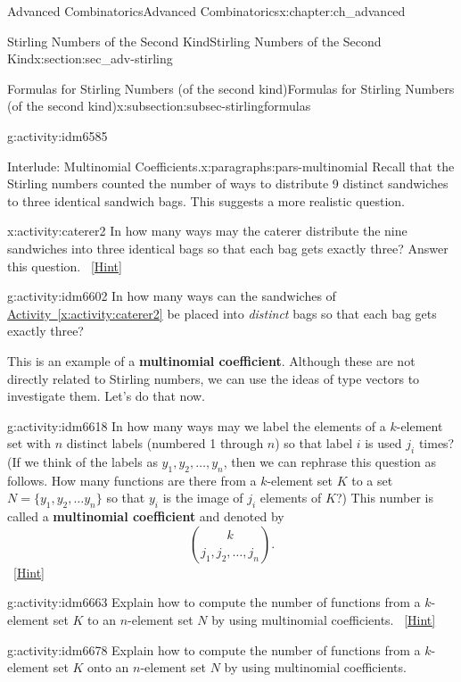 \documentclass[oneside,10pt,]{book}
\newcommand{\terminology}[1]{\textbf{#1}}
\numberwithin{equation}{chapter}
\begin{document}
\begin{chapterptx}{Advanced Combinatorics}{}{Advanced Combinatorics}{}{}{x:chapter:ch_advanced}
\begin{sectionptx}{Stirling Numbers of the Second Kind}{}{Stirling Numbers of the Second Kind}{}{}{x:section:sec_adv-stirling}
\begin{subsectionptx}{Formulas for Stirling Numbers (of the second kind)}{}{Formulas for Stirling Numbers (of the second kind)}{}{}{x:subsection:subsec-stirlingformulas}
\begin{activity}{}{g:activity:idm6585}
\end{activity}
\begin{paragraphs}{Interlude: Multinomial Coefficients.}{x:paragraphs:pars-multinomial}%
Recall that the Stirling numbers counted the number of ways to distribute 9 distinct sandwiches to three identical sandwich bags.  This suggests a more realistic question.%
\begin{activity}{}{x:activity:caterer2}%
In how many ways may the caterer distribute the nine sandwiches into three identical bags so that each bag gets exactly three? Answer this question.%
\qquad~\hfill{\tiny\hyperlink{g:hint:idm6596-back}{[Hint]}}\end{activity}
\begin{activity}{}{g:activity:idm6602}%
In how many ways can the sandwiches of \hyperref[x:activity:caterer2]{Activity~\ref{x:activity:caterer2}} be placed into \emph{distinct} bags so that each bag gets exactly three?%
\end{activity}
This is an example of a \terminology{multinomial coefficient}.  Although these are not directly related to Stirling numbers, we can use the ideas of type vectors to investigate them.  Let's do that now.%
\begin{activity}{}{g:activity:idm6618}%
In how many ways may we label the elements of a \(k\)-element set with \(n\) distinct labels (numbered 1 through \(n\)) so that label \(i\) is used \(j_i\) times? (If we think of the labels as \(y_1, y_2, \ldots, y_n\), then we can rephrase this question as follows.  How many functions are there from a \(k\)-element set \(K\) to a set \(N=\{y_1,y_2,\ldots y_n\}\) so that \(y_i\) is the image of \(j_i\) elements of \(K\)?) This number is called a \terminology{multinomial coefficient} and denoted by%
\begin{equation*}
\binom{k}{j_1,j_2,\ldots, j_n}.
\end{equation*}
%
\qquad~\hfill{\tiny\hyperlink{g:hint:idm6640-back}{[Hint]}}\end{activity}
\begin{activity}{}{g:activity:idm6663}%
Explain how to compute the number of functions from a \(k\)-element set \(K\) to an \(n\)-element set \(N\) by using multinomial coefficients.%
\qquad~\hfill{\tiny\hyperlink{g:hint:idm6670-back}{[Hint]}}\end{activity}
\begin{activity}{}{g:activity:idm6678}%
Explain how to compute the number of functions from a \(k\)-element set \(K\) onto an \(n\)-element set \(N\) by using multinomial coefficients.%

\end{activity}
\end{paragraphs}
\end{subsectionptx}
\end{sectionptx}
\end{chapterptx}
\end{document}
